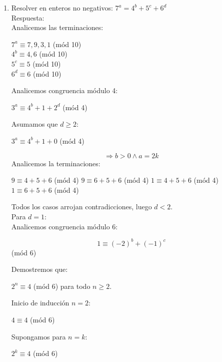 \documentclass{book}
\begin{document}
\begin{enumerate}
    \item Resolver en enteros no negativos: $7^a=4^b+5^c+6^d$\\
          Respuesta:\\
          Analicemos las terminaciones:
          \begin{center}
              $7^a\equiv 7 ,9 ,3 ,1$ (mód 10)\\
              $4^b\equiv 4 ,6$ (mód 10)\\
              $5^c\equiv 5$ (mód 10)\\
              $6^d\equiv 6$ (mód 10)\\
          \end{center}
          Analicemos congruencia módulo 4:
          \begin{center}
              $3^a\equiv 4^b+1+2^d$  (mód 4)\\
          \end{center}
          Asumamos que $d\geq 2$:
          \begin{center}
              $3^a\equiv 4^b+1+0$ (mód 4)
          \end{center}
          $$\Rightarrow b>0 \wedge a=2k$$
          Analicemos la terminaciones:
          \begin{center}
              $9\equiv 4+5+6$ (mód 4)
              $9\equiv 6+5+6$ (mód 4)
              $1\equiv 4+5+6$ (mód 4)
              $1\equiv 6+5+6$ (mód 4)
          \end{center}
          Todos los casos arrojan contradicciones, luego $d<2$.\\
          Para $d=1$:\\
          Analicemos congruencia módulo 6:
          \begin{center}
              $$1\equiv{(-2)}^b+{(-1)}^c$$  (mód 6)\\
          \end{center}
          Demostremos que:
          \begin{center}
              $2^n\equiv 4$ (mód 6) para todo $n\geq2$.\\
          \end{center}
          Inicio de inducción $n=2$:
          \begin{center}
              $4\equiv 4$ (mód 6)\\
          \end{center}
          Supongamos para $n=k$:
          \begin{center}
              $2^k\equiv 4$ (mód 6)\\

\end{center}
\end{enumerate}
\end{document}

